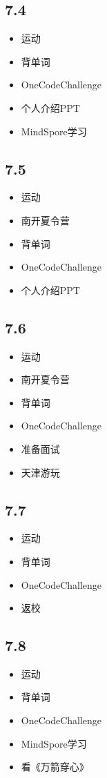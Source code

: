 \documentclass[UTF8]{ctexart}
\begin{document}
\subsection*{7.4}
\begin{itemize}
    \item 运动
    \item 背单词
    \item OneCodeChallenge
    \item 个人介绍PPT
    \item MindSpore学习
\end{itemize}

\subsection*{7.5}
\begin{itemize}
    \item 运动
    \item 南开夏令营
    \item 背单词
    \item OneCodeChallenge
    \item 个人介绍PPT
\end{itemize}

\subsection*{7.6}
\begin{itemize}
    \item 运动
    \item 南开夏令营
    \item 背单词
    \item OneCodeChallenge
    \item 准备面试
    \item 天津游玩
\end{itemize}

\subsection*{7.7}
\begin{itemize}
    \item 运动
    \item 背单词
    \item OneCodeChallenge
    \item 返校
\end{itemize}

\subsection*{7.8}
\begin{itemize}
    \item 运动
    \item 背单词
    \item OneCodeChallenge
    \item MindSpore学习
    \item 看《万箭穿心》
\end{itemize}
\end{document}
